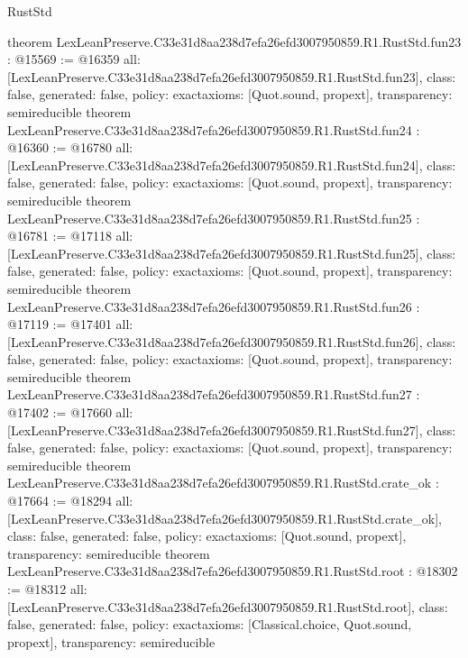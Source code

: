 \begin{lexlean}{RustStd}
\begin{coremodule}
{}
theorem LexLeanPreserve.C33e31d8aa238d7efa26efd3007950859.R1.RustStd.fun23 : @15569 := @16359 {
  all: [LexLeanPreserve.C33e31d8aa238d7efa26efd3007950859.R1.RustStd.fun23],
  class: false,
  generated: false,
  policy: exact{axioms: [Quot.sound, propext]},
  transparency: semireducible
}
theorem LexLeanPreserve.C33e31d8aa238d7efa26efd3007950859.R1.RustStd.fun24 : @16360 := @16780 {
  all: [LexLeanPreserve.C33e31d8aa238d7efa26efd3007950859.R1.RustStd.fun24],
  class: false,
  generated: false,
  policy: exact{axioms: [Quot.sound, propext]},
  transparency: semireducible
}
theorem LexLeanPreserve.C33e31d8aa238d7efa26efd3007950859.R1.RustStd.fun25 : @16781 := @17118 {
  all: [LexLeanPreserve.C33e31d8aa238d7efa26efd3007950859.R1.RustStd.fun25],
  class: false,
  generated: false,
  policy: exact{axioms: [Quot.sound, propext]},
  transparency: semireducible
}
theorem LexLeanPreserve.C33e31d8aa238d7efa26efd3007950859.R1.RustStd.fun26 : @17119 := @17401 {
  all: [LexLeanPreserve.C33e31d8aa238d7efa26efd3007950859.R1.RustStd.fun26],
  class: false,
  generated: false,
  policy: exact{axioms: [Quot.sound, propext]},
  transparency: semireducible
}
theorem LexLeanPreserve.C33e31d8aa238d7efa26efd3007950859.R1.RustStd.fun27 : @17402 := @17660 {
  all: [LexLeanPreserve.C33e31d8aa238d7efa26efd3007950859.R1.RustStd.fun27],
  class: false,
  generated: false,
  policy: exact{axioms: [Quot.sound, propext]},
  transparency: semireducible
}
theorem LexLeanPreserve.C33e31d8aa238d7efa26efd3007950859.R1.RustStd.crate_ok : @17664 := @18294 {
  all: [LexLeanPreserve.C33e31d8aa238d7efa26efd3007950859.R1.RustStd.crate_ok],
  class: false,
  generated: false,
  policy: exact{axioms: [Quot.sound, propext]},
  transparency: semireducible
}
theorem LexLeanPreserve.C33e31d8aa238d7efa26efd3007950859.R1.RustStd.root : @18302 := @18312 {
  all: [LexLeanPreserve.C33e31d8aa238d7efa26efd3007950859.R1.RustStd.root],
  class: false,
  generated: false,
  policy: exact{axioms: [Classical.choice, Quot.sound, propext]},
  transparency: semireducible
}


\end{coremodule}
\end{lexlean}
